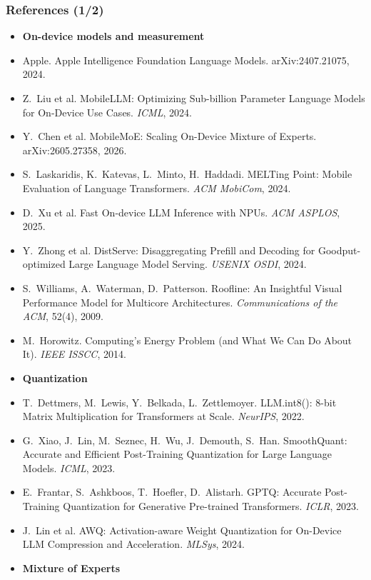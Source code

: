
\begin{frame}
\frametitle{References (1/2)}
\tiny
\begin{itemize}\setlength{\itemsep}{1pt}
\item[] \textbf{On-device models and measurement}
\item Apple. Apple Intelligence Foundation Language Models. arXiv:2407.21075, 2024.
\item Z.~Liu et al. MobileLLM: Optimizing Sub-billion Parameter Language Models for On-Device Use Cases. \emph{ICML}, 2024.
\item Y.~Chen et al. MobileMoE: Scaling On-Device Mixture of Experts. arXiv:2605.27358, 2026.
\item S.~Laskaridis, K.~Katevas, L.~Minto, H.~Haddadi. MELTing Point: Mobile Evaluation of Language Transformers. \emph{ACM MobiCom}, 2024.
\item D.~Xu et al. Fast On-device LLM Inference with NPUs. \emph{ACM ASPLOS}, 2025.
\item Y.~Zhong et al. DistServe: Disaggregating Prefill and Decoding for Goodput-optimized Large Language Model Serving. \emph{USENIX OSDI}, 2024.
\item S.~Williams, A.~Waterman, D.~Patterson. Roofline: An Insightful Visual Performance Model for Multicore Architectures. \emph{Communications of the ACM}, 52(4), 2009.
\item M.~Horowitz. Computing's Energy Problem (and What We Can Do About It). \emph{IEEE ISSCC}, 2014.
\item[] \textbf{Quantization}
\item T.~Dettmers, M.~Lewis, Y.~Belkada, L.~Zettlemoyer. LLM.int8(): 8-bit Matrix Multiplication for Transformers at Scale. \emph{NeurIPS}, 2022.
\item G.~Xiao, J.~Lin, M.~Seznec, H.~Wu, J.~Demouth, S.~Han. SmoothQuant: Accurate and Efficient Post-Training Quantization for Large Language Models. \emph{ICML}, 2023.
\item E.~Frantar, S.~Ashkboos, T.~Hoefler, D.~Alistarh. GPTQ: Accurate Post-Training Quantization for Generative Pre-trained Transformers. \emph{ICLR}, 2023.
\item J.~Lin et al. AWQ: Activation-aware Weight Quantization for On-Device LLM Compression and Acceleration. \emph{MLSys}, 2024.
\item[] \textbf{Mixture of Experts}

\end{itemize}
\end{frame}
